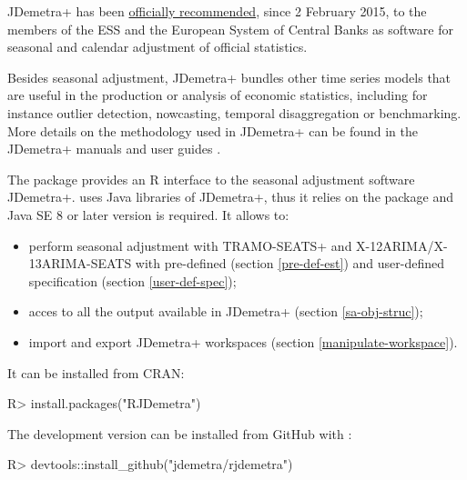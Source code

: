 \documentclass[article]{jss}
\providecommand{\tightlist}{%
  \setlength{\itemsep}{0pt}\setlength{\parskip}{0pt}}
\begin{document}
JDemetra+ has been
\href{https://ec.europa.eu/eurostat/cros/system/files/Jdemetra_\%20release.pdf}{officially
recommended}, since 2 February 2015, to the members of the ESS and the
European System of Central Banks as software for seasonal and calendar
adjustment of official statistics.

Besides seasonal adjustment, JDemetra+ bundles other time series models
that are useful in the production or analysis of economic statistics,
including for instance outlier detection, nowcasting, temporal
disaggregation or benchmarking. More details on the methodology used in
JDemetra+ can be found in the JDemetra+ manuals and user guides
\citep{grudkowska2015jdemetrarm, grudkowska2015jdemetraug}.

The package  provides an R interface to the seasonal
adjustment software JDemetra+.  uses Java libraries of
JDemetra+, thus it relies on the  \citep{rJava} package and
Java SE 8 or later version is required. It allows to:

\begin{itemize}
\tightlist
\item
  perform seasonal adjustment with TRAMO-SEATS+ and
  X-12ARIMA/X-13ARIMA-SEATS with pre-defined (section \ref{pre-def-est})
  and user-defined specification (section \ref{user-def-spec});\\
\item
  acces to all the output available in JDemetra+ (section
  \ref{sa-obj-struc});\\
\item
  import and export JDemetra+ workspaces (section
  \ref{manipulate-workspace}).
\end{itemize}

It can be installed from CRAN:

\begin{CodeChunk}

\begin{CodeInput}
R> install.packages("RJDemetra")
\end{CodeInput}
\end{CodeChunk}

The development version can be installed from GitHub with 
\citep{devtools}:

\begin{CodeChunk}

\begin{CodeInput}
R> devtools::install_github("jdemetra/rjdemetra")
\end{CodeInput}
\end{CodeChunk}
\end{document}
